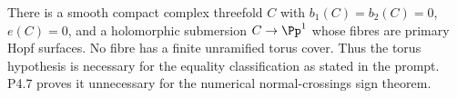 
\begin{proposition}[P4.11]\hypertarget{tag-02WI}{}\label{night:P4.11}\label{stmt:P4.11}


There is a smooth compact complex threefold $C$ with
$b_1(C)=b_2(C)=0$, $e(C)=0$, and a holomorphic submersion
$C\to\Pp^1$ whose fibres are primary Hopf surfaces. No fibre has
a finite unramified torus cover. Thus the torus hypothesis is
necessary for the equality classification as stated in the prompt.
P4.7 proves it unnecessary for the numerical normal-crossings
sign theorem.
\end{proposition}

